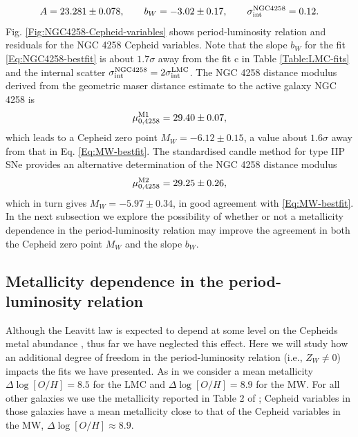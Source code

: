 \begin{equation}\label{Eq:NGC4258-bestfit}
A = 23.281 \pm 0.078  , \qquad b_W = -3.02 \pm 0.17  , \qquad \sigma_{\mathrm{int}}^{\rm NGC4258} = 0.12 .
\end{equation}
Fig. \ref{Fig:NGC4258-Cepheid-variables} shows period-luminosity relation and residuals for the NGC 4258 Cepheid variables. Note that the slope $b_W$ for the fit \eqref{Eq:NGC4258-bestfit} is about $1.7\sigma$ away from the fit c in Table \ref{Table:LMC-fits} and the internal scatter $\sigma_{\mathrm{int}}^{\rm NGC4258}=2\sigma_{\mathrm{int}}^{\mathrm{LMC}}$. The NGC 4258 distance modulus derived from the geometric maser distance estimate to the active galaxy NGC 4258 \cite{Humphreys:2013eja} is 
\begin{equation}
\mu_{0,\rm 4258}^{\rm M1} = 29.40 \pm 0.07,
\label{Eq:NGC4258-measured-distance-modulus-2013}
\end{equation}
which leads to a Cepheid zero point $M_W=-6.12 \pm 0.15$, a value about $1.6\sigma$ away from that in Eq. \eqref{Eq:MW-bestfit}. The standardised candle method for type IIP SNe \cite{Polshaw:2015ika} provides an alternative determination of the NGC 4258 distance modulus
\begin{equation}
\mu_{0,\rm 4258}^{\rm M2} = 29.25 \pm 0.26,
\label{Eq:NGC4258-measured-distance-modulus-2015}
\end{equation}
which in turn gives $M_W=-5.97 \pm 0.34$, in good agreement with \eqref{Eq:MW-bestfit}. In the next subsection we explore the possibility of whether or not a metallicity dependence in the period-luminosity relation may improve the agreement in both the Cepheid zero point $M_W$ and the slope $b_W$. 

\subsection{Metallicity dependence in the period-luminosity relation}\label{Subsection:Zw-dependence}

Although the Leavitt law is expected to depend at some level on the Cepheids metal abundance \cite{Freedman:2010xv}, thus far we have neglected this effect. Here we will study how an additional degree of freedom in the period-luminosity relation (i.e., $Z_W \neq 0$) impacts the fits we have presented. As in \cite{Efstathiou:2013via} we consider a mean metallicity $\Delta \log[O/H]=8.5$ for the LMC and $\Delta \log[O/H]=8.9$ for the MW. For all other galaxies we use the metallicity reported in Table 2 of \cite{Riess:2011yx}; Cepheid variables in those galaxies have a mean metallicity close to that of the Cepheid variables in the MW, $\Delta \log[O/H] \approx 8.9$.

